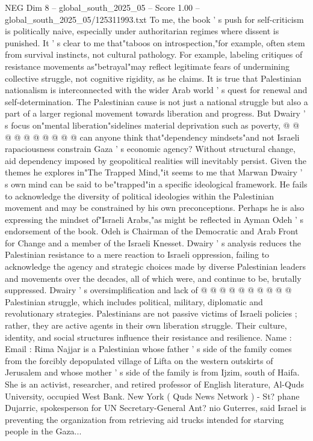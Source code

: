 \begin{textsample}{NEG Dim 8 – global\_south\_2025\_05 – Score 1.00 – global\_south\_2025\_05/125311993.txt}
To me, the book ' s push for self-criticism is politically naive, especially under authoritarian regimes where dissent is punished.
It ' s clear to me that"taboos on introspection,"for example, often stem from survival instincts, not cultural pathology.
For example, labeling critiques of resistance movements as"betrayal"may reflect legitimate fears of undermining collective struggle, not cognitive rigidity, as he claims.
It is true that Palestinian nationalism is interconnected with the wider Arab world ' s quest for renewal and self-determination.
The Palestinian cause is not just a national struggle but also a part of a larger regional movement towards liberation and progress.
But Dwairy ' s focus on"mental liberation"sidelines material deprivation such as poverty, @ @ @ @ @ @ @ @ @ @ can anyone think that"dependency mindsets"and not Israeli rapaciousness constrain Gaza ' s economic agency?
Without structural change, aid dependency imposed by geopolitical realities will inevitably persist.
Given the themes he explores in"The Trapped Mind,"it seems to me that Marwan Dwairy ' s own mind can be said to be"trapped"in a specific ideological framework.
He fails to acknowledge the diversity of political ideologies within the Palestinian movement and may be constrained by his own preconceptions.
Perhaps he is also expressing the mindset of"Israeli Arabs,"as might be reflected in Ayman Odeh ' s endorsement of the book.
Odeh is Chairman of the Democratic and Arab Front for Change and a member of the Israeli Knesset.
Dwairy ' s analysis reduces the Palestinian resistance to a mere reaction to Israeli oppression, failing to acknowledge the agency and strategic choices made by diverse Palestinian leaders and movements over the decades, all of which were, and continue to be, brutally suppressed.
Dwairy ' s oversimplification and lack of @ @ @ @ @ @ @ @ @ @ Palestinian struggle, which includes political, military, diplomatic and revolutionary strategies.
Palestinians are not passive victims of Israeli policies ; rather, they are active agents in their own liberation struggle.
Their culture, identity, and social structures influence their resistance and resilience.
Name : Email : Rima Najjar is a Palestinian whose father ' s side of the family comes from the forcibly depopulated village of Lifta on the western outskirts of Jerusalem and whose mother ' s side of the family is from Ijzim, south of Haifa.
She is an activist, researcher, and retired professor of English literature, Al-Quds University, occupied West Bank.
New York ( Quds News Network ) - St? phane Dujarric, spokesperson for UN Secretary-General Ant? nio Guterres, said Israel is preventing the organization from retrieving aid trucks intended for starving people in the Gaza...

\end{textsample}
